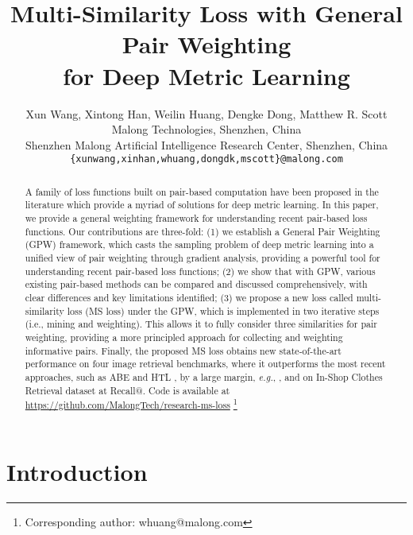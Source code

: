 \documentclass[10pt,twocolumn,letterpaper]{article}
\newcommand\blfootnote[1]{\begingroup
  \renewcommand\thefootnote{}\footnote{#1}\addtocounter{footnote}{-1}\endgroup
}
\begin{document}
	
	
\title{Multi-Similarity Loss with General Pair Weighting \\for Deep Metric Learning}

\author{Xun Wang, Xintong Han, Weilin Huang, Dengke Dong, Matthew R. Scott\\
Malong Technologies, Shenzhen, China\\
Shenzhen Malong Artificial Intelligence Research Center, Shenzhen, China\\
{\tt\small \{xunwang,xinhan,whuang,dongdk,mscott\}@malong.com}
}

\maketitle
\begin{abstract}	
A family of loss functions built on pair-based computation have been proposed in the literature which provide a myriad of solutions for deep metric learning.
In this paper, we provide a general weighting framework for understanding recent pair-based loss functions. Our contributions are three-fold: (1) we establish a General Pair Weighting (GPW) framework, which casts the sampling problem of deep metric learning into a unified view of pair weighting through gradient analysis, providing a powerful tool for understanding recent pair-based loss functions; (2) we show that with GPW, various existing pair-based methods can be compared and discussed comprehensively, with clear differences and key limitations identified; (3) we propose a new loss called multi-similarity loss (MS loss) under the GPW, which is implemented in two iterative steps (i.e., mining and weighting). This allows it to fully consider three similarities for pair weighting, providing a more principled approach for collecting and weighting informative pairs.
Finally, the proposed MS loss obtains new state-of-the-art performance on four image retrieval benchmarks,
where it outperforms the most recent approaches, such as  ABE\cite{Kim_2018_ECCV} and HTL \cite{HTL}, by a large margin, {\it e.g.}, , and  on In-Shop Clothes Retrieval dataset at Recall@. Code is available at \url{https://github.com/MalongTech/research-ms-loss}
\blfootnote{Corresponding author: whuang@malong.com}

\end{abstract}

\section{Introduction}
\end{document}
